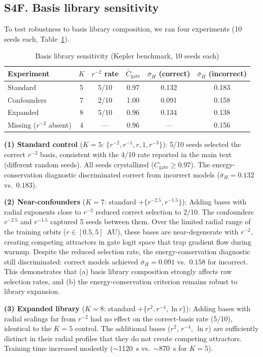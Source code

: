 \documentclass[aps,pre,reprint,superscriptaddress]{revtex4-2}
\begin{document}
\subsection{S4F. Basis library sensitivity}
To test robustness to basis library composition, we ran four experiments (10 seeds each, Table~\ref{tab:basis-sensitivity}).

\begin{table}[!ht]
\centering
\caption{Basis library sensitivity (Kepler benchmark, 10 seeds each)}
\label{tab:basis-sensitivity}
\small
\begin{tabular}{lccccc}
\hline
Experiment & $K$ & $r^{-2}$ rate & $\bar{C}_{\mathrm{gate}}$ & $\bar{\sigma}_H$ (correct) & $\bar{\sigma}_H$ (incorrect) \\
\hline
Standard & 5 & 5/10 & 0.97 & 0.132 & 0.183 \\
Confounders & 7 & 2/10 & 1.00 & 0.091 & 0.158 \\
Expanded & 8 & 5/10 & 0.96 & 0.134 & 0.138 \\
Missing ($r^{-2}$ absent) & 4 & --- & 0.96 & --- & 0.156 \\
\hline
\end{tabular}
\end{table}

\textbf{(1) Standard control} ($K=5$: $\{r^{-2}, r^{-1}, r, 1, r^{-3}\}$): 5/10 seeds selected the correct $r^{-2}$ basis, consistent with the 4/10 rate reported in the main text (different random seeds). All seeds crystallized ($C_{\mathrm{gate}} \geq 0.97$). The energy-conservation diagnostic discriminated correct from incorrect models ($\bar{\sigma}_H = 0.132$ vs.\ $0.183$).

\textbf{(2) Near-confounders} ($K=7$: standard $+ \{r^{-2.5}, r^{-1.5}\}$): Adding bases with radial exponents close to $r^{-2}$ reduced correct selection to 2/10. The confounders $r^{-2.5}$ and $r^{-1.5}$ captured 5 seeds between them. Over the limited radial range of the training orbits ($r \in [0.5, 5]$~AU), these bases are near-degenerate with $r^{-2}$, creating competing attractors in gate logit space that trap gradient flow during warmup. Despite the reduced selection rate, the energy-conservation diagnostic still discriminated: correct models achieved $\bar{\sigma}_H = 0.091$ vs.\ $0.158$ for incorrect. This demonstrates that (a) basis library composition strongly affects raw selection rates, and (b) the energy-conservation criterion remains robust to library expansion.

\textbf{(3) Expanded library} ($K=8$: standard $+ \{r^2, r^{-4}, \ln r\}$): Adding bases with radial scalings far from $r^{-2}$ had no effect on the correct-basis rate (5/10), identical to the $K=5$ control. The additional bases ($r^2$, $r^{-4}$, $\ln r$) are sufficiently distinct in their radial profiles that they do not create competing attractors. Training time increased modestly ($\sim$1120~s vs.\ $\sim$870~s for $K=5$).
\end{document}
